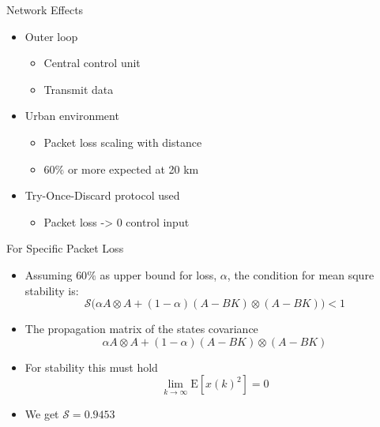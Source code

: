 \begin{frame}{Network Effects}
	\begin{itemize}
		\item Outer loop
		\begin{itemize}
			\item Central control unit
			\item Transmit data
		\end{itemize}
		\item Urban environment
		\begin{itemize}
			\item Packet loss scaling with distance
			\item $ 60\% $ or more expected at 20 km
		\end{itemize}
		\item Try-Once-Discard protocol used
		\begin{itemize}
			\item Packet loss -> 0 control input
		\end{itemize}
	\end{itemize}
	\begin{figure}[h!]
	\centering
	\resizebox{0.9\columnwidth}{!}{
		}
	\label{fig:tikzControlStructure}
\end{figure}
\end{frame}

\begin{frame}{For Specific Packet Loss}
	\begin{itemize}
		\item Assuming $ 60\% $ as upper bound for loss, $ \alpha $, the condition for mean squre stability is:
	\begin{equation}\label{eq:HuStabCondition}
		\mathcal{S}\Big(\alpha A \otimes A + (1-\alpha)(A-BK) \otimes (A-BK) \Big) < 1
	\end{equation}
		\item The propagation matrix of the states covariance
	\begin{equation}\label{eq:HuStabCondition}
		\alpha A \otimes A + (1-\alpha)(A-BK) \otimes (A-BK) 
	\end{equation}
		\item For stability this must hold 
	\begin{equation}
		\lim_{k \rightarrow \infty} \text{E}[x(k)^2] = 0
	\end{equation}
		\item We get $\mathcal{S} = 0.9453 $
	\end{itemize}
\end{frame}	
	
